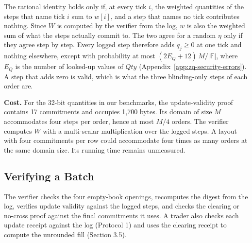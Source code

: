 The rational identity holds only if, at every tick \(i\), the weighted quantities of the steps that name tick \(i\) sum to \(w[i]\), and a step that names no tick contributes nothing. Since \(W\) is computed by the verifier from the log, \(w\) is also the weighted sum of what the steps actually commit to. The two agree for a random \(\eta\) only if they agree step by step. Every logged step therefore adds \(q_j \ge 0\) at one tick and nothing elsewhere, except with probability at most \((2E_Q + 12)\,M/|\mathbb{F}|\), where \(E_Q\) is the number of looked-up values of \(Qty\) (Appendix~\ref{app:zq-security-errors}). A step that adds zero is valid, which is what the three blinding-only steps of each order are.

\textbf{Cost.} For the 32-bit quantities in our benchmarks, the update-validity proof contains 17 commitments and occupies 1,700 bytes. Its domain of size \(M\) accommodates four steps per order, hence at most \(M/4\) orders. The verifier computes \(W\) with a multi-scalar multiplication over the logged steps. A layout with four commitments per row could accommodate four times as many orders at the same domain size. Its running time remains unmeasured.

\subsection{Verifying a Batch}

The verifier checks the four empty-book openings, recomputes the digest from the log, verifies update validity against the logged steps, and checks the clearing or no-cross proof against the final commitments it uses. A trader also checks each update receipt against the log (Protocol 1) and uses the clearing receipt to compute the unrounded fill (Section 3.5).


